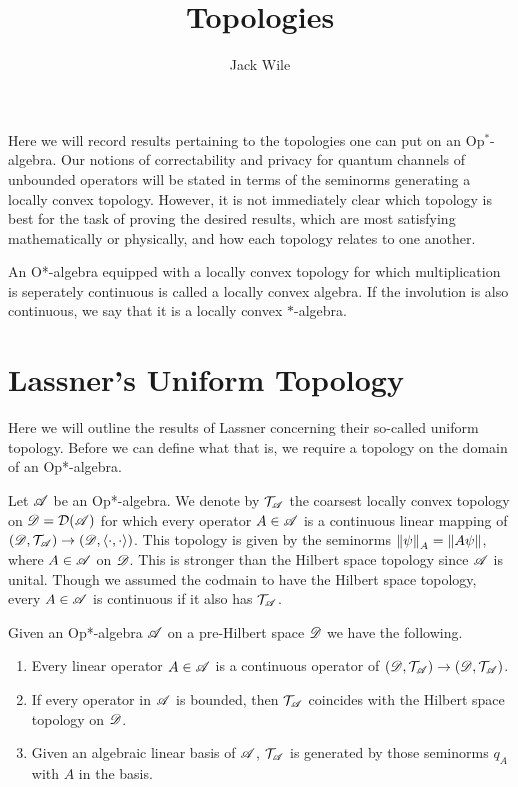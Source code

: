 \documentclass[../main.tex]{subfiles}
\title{Topologies}
\author{Jack Wile}
\date{}
\begin{document}
Here we will record results pertaining to the topologies one can put on an Op$^*$-algebra. Our notions of correctability and privacy
for quantum channels of unbounded operators will be stated in terms of the seminorms generating a locally convex topology. However, it is 
not immediately clear which topology is best for the task of proving the desired results, which are most satisfying mathematically or physically,
and how each topology relates to one another.

\begin{definition}
	An O*-algebra equipped with a locally convex topology for which multiplication is seperately continuous is called
	a locally convex algebra. If the involution is also continuous, we say that it is a locally convex $\ast$-algebra.
\end{definition}


\section*{Lassner's Uniform Topology}

Here we will outline the results of Lassner concerning their so-called uniform topology. Before we can define what that is, we require
a topology on the domain of an Op*-algebra.

Let $\mathscr{A}$ be an Op*-algebra. We denote by $\mathcal{T}_\mathscr{A}$ the coarsest locally convex topology on $\mathscr{D} = \mathcal{D}(\mathscr{A})$
for which every operator $A \in \mathscr{A}$ is a continuous linear mapping of $(\mathscr{D}, \mathcal{T}_\mathscr{A}) \to (\mathscr{D}, \langle \cdot, \cdot \rangle)$.
This topology is given by the seminorms $\left\lVert\psi\right\rVert_A = \|A\psi\|$, where $A \in \mathscr{A}$ on $\mathscr{D}$. This is stronger than the Hilbert 
space topology since $\mathscr{A}$ is unital. Though we assumed the codmain to have the Hilbert space topology, every $A \in \mathscr{A}$ is 
continuous if it also has $\mathcal{T}_\mathscr{A}$.

\begin{theorem}

	Given an Op*-algebra $\mathscr{A}$ on a pre-Hilbert space $\mathscr{D}$ we have the following.
	
	\begin{enumerate}
	\item Every linear operator $A \in \mathscr{A}$ is a continuous operator of $(\mathscr{D}, \mathcal{T}_\mathscr{A}) \to (\mathscr{D}, \mathcal{T}_\mathscr{A})$.
	\item If every operator in $\mathscr{A}$ is bounded, then $\mathcal{T}_\mathscr{A}$ coincides with the Hilbert space topology on $\mathscr{D}$.
	\item Given an algebraic linear basis of $\mathscr{A}$, $\mathcal{T}_\mathscr{A}$ is generated by those seminorms $q_A$ with $A$ in the basis.

	\end{enumerate}

\end{theorem}
\end{document}

